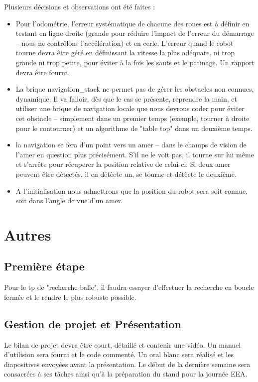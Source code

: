 \documentclass[a4wide,10pt]{article}
\begin{document}
Plusieurs décisions et observations ont été faites :

\begin{itemize}
\item Pour l'odométrie, l'erreur systématique de chacune des roues est à définir en testant en ligne droite (grande pour réduire l'impact de l'erreur du démarrage -- nous ne contrôlons l'accélération) et en cerle. L'erreur quand le robot tourne devra être géré en définissant la vitesse la plus adéquate, ni trop grande ni trop petite, pour éviter à la fois les sauts et le patinage. Un rapport devra être fourni.
\item La brique navigation\_stack ne permet pas de gérer les obstacles non connues, dynamique. Il va falloir, dès que le cas se présente, reprendre la main, et utiliser une brique de navigation locale que nous devrons coder pour éviter cet obstacle -- simplement dans un premier temps (exemple, tourner à droite pour le contourner) et un algorithme de "table top" dans un deuxième temps.
\item la navigation se fera d'un point vers un amer -- dans le champs de vision de l'amer en question plus précisément. S'il ne le voit pas, il tourne sur lui même et s'arrête pour récuperer la position relative de celui-ci. Si deux amer peuvent être détectés, il en détècte un, se tourne et détècte le deuxième.
\item A l'initialisation nous admettrons que la position du robot sera soit connue, soit dans l'angle de vue d'un amer. 
\end{itemize}


\section*{Autres}

\subsection*{Première étape}
Pour le tp de "recherche balle", il faudra essayer d'effectuer la recherche en boucle fermée et le rendre le plus robuste possible.

\subsection*{Gestion de projet et Présentation}
Le bilan de projet devra être court, détaillé et contenir une vidéo. Un manuel d'utilision sera fourni et le code commenté. Un oral blanc sera réalisé et les diapositives envoyées avant la présentation. Le début de la dernière semaine sera consacrées à ses tâches ainsi qu'à la préparation du stand pour la journée EEA. 

\subsection*{\color{red}{Prochaine réunion : Mardi 21 mars 2017 entre 10h et 12h}}
\subsection*{\color{red}{Oral : Mecredi 22 mars 2017 après-midi}}
\subsection*{\color{red}{Stand : Jeudi 23 mars 2017 après-midi}}
\end{document}
